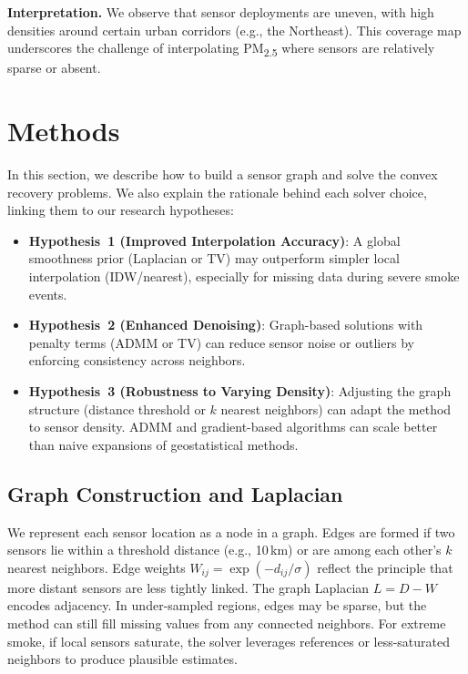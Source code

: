 \documentclass[12pt]{article}                                %
\begin{document}
\noindent
\textbf{Interpretation.} 
We observe that sensor deployments are uneven, with high densities around certain urban corridors (e.g., the Northeast). This coverage map underscores the challenge of interpolating PM\textsubscript{2.5} where sensors are relatively sparse or absent.

\section{Methods}
\label{sec:methods}    %

In this section, we describe how to build a sensor graph and solve the convex recovery problems. 
We also explain the rationale behind each solver choice, linking them to our research hypotheses:

\begin{itemize}
    \item \textbf{Hypothesis~1 (Improved Interpolation Accuracy)}: A global smoothness prior 
    (Laplacian or TV) may outperform simpler local interpolation (IDW/nearest), especially for 
    missing data during severe smoke events.
    \item \textbf{Hypothesis~2 (Enhanced Denoising)}: Graph-based solutions with penalty terms 
    (ADMM or TV) can reduce sensor noise or outliers by enforcing consistency across neighbors.
    \item \textbf{Hypothesis~3 (Robustness to Varying Density)}: Adjusting the graph structure 
    (distance threshold or $k$ nearest neighbors) can adapt the method to sensor density. 
    ADMM and gradient-based algorithms can scale better than naive expansions of geostatistical methods.
\end{itemize}

\subsection{Graph Construction and Laplacian}   %
We represent each sensor location as a node in a graph. Edges are formed if two sensors lie 
within a threshold distance (e.g., 10\,km) or are among each other's $k$ nearest neighbors. 
Edge weights $W_{ij} = \exp(-d_{ij}/\sigma)$ reflect the principle that more distant sensors 
are less tightly linked. The graph Laplacian $L = D - W$ encodes adjacency. In under-sampled 
regions, edges may be sparse, but the method can still fill missing values from any connected 
neighbors. For extreme smoke, if local sensors saturate, the solver leverages references or 
less-saturated neighbors to produce plausible estimates.
\end{document}

